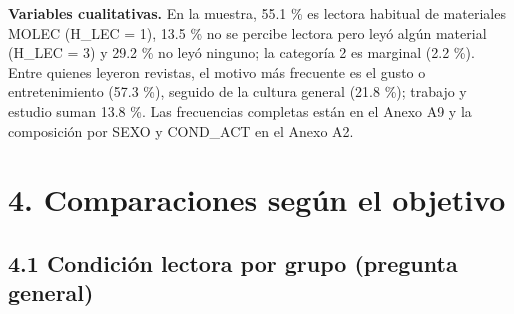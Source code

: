 \documentclass[
  spanish,
  12pt,
]{extarticle}
\begin{document}
\textbf{Variables cualitativas.} En la muestra, 55.1 \% es lectora
habitual de materiales MOLEC (H\_LEC = 1), 13.5 \% no se percibe lectora
pero leyó algún material (H\_LEC = 3) y 29.2 \% no leyó ninguno; la
categoría 2 es marginal (2.2 \%). Entre quienes leyeron revistas, el
motivo más frecuente es el gusto o entretenimiento (57.3 \%), seguido de
la cultura general (21.8 \%); trabajo y estudio suman 13.8 \%. Las
frecuencias completas están en el Anexo A9 y la composición por SEXO y
COND\_ACT en el Anexo A2.

\section{4. Comparaciones según el
objetivo}\label{comparaciones-seguxfan-el-objetivo}

\subsection{4.1 Condición lectora por grupo (pregunta
general)}\label{condiciuxf3n-lectora-por-grupo-pregunta-general}
\end{document}
